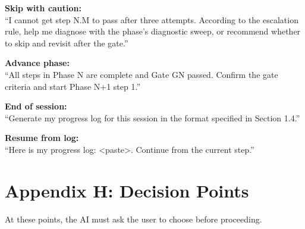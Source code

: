 \documentclass[10pt,a4paper]{article}
\begin{document}
\begin{aiprompt}
\textbf{Skip with caution:}\\
``I cannot get step N.M to pass after three attempts. According to the escalation rule, help me diagnose with the phase's diagnostic sweep, or recommend whether to skip and revisit after the gate.''
\end{aiprompt}

\begin{aiprompt}
\textbf{Advance phase:}\\
``All steps in Phase N are complete and Gate GN passed. Confirm the gate criteria and start Phase N+1 step 1.''
\end{aiprompt}

\begin{aiprompt}
\textbf{End of session:}\\
``Generate my progress log for this session in the format specified in Section 1.4.''
\end{aiprompt}

\begin{aiprompt}
\textbf{Resume from log:}\\
``Here is my progress log: <paste>. Continue from the current step.''
\end{aiprompt}

\section{Appendix H: Decision Points}

At these points, the AI must ask the user to choose before proceeding.
\end{document}
